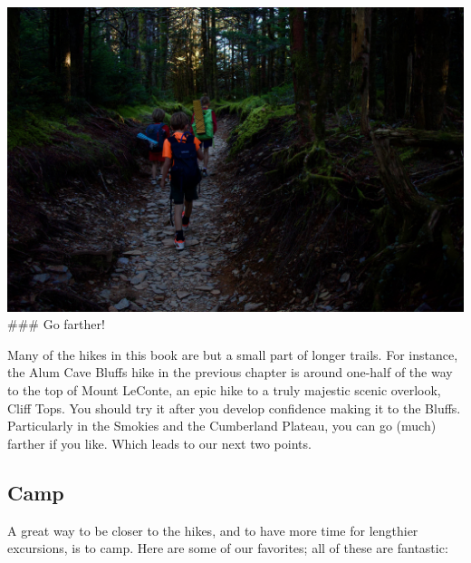\documentclass[
  letterpaper,
  DIV=11,
  numbers=noendperiod]{scrreprt}
\begin{document}
\includegraphics[width=10.41667in,height=\textheight,keepaspectratio]{img/kids-leconte.jpeg}
\#\#\# Go farther!

Many of the hikes in this book are but a small part of longer trails.
For instance, the Alum Cave Bluffs hike in the previous chapter is
around one-half of the way to the top of Mount LeConte, an epic hike to
a truly majestic scenic overlook, Cliff Tops. You should try it after
you develop confidence making it to the Bluffs. Particularly in the
Smokies and the Cumberland Plateau, you can go (much) farther if you
like. Which leads to our next two points.

\subsection{Camp}\label{camp}

A great way to be closer to the hikes, and to have more time for
lengthier excursions, is to camp. Here are some of our favorites; all of
these are fantastic:
\end{document}
